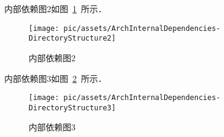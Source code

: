 内部依赖图2如图~\ref{ArchInternalDependencies-DirectoryStructure2}~所示．	

     \begin{figure}[!htbp]
            \centering	\texttt{[image: pic/assets/ArchInternalDependencies-DirectoryStructure2]}
            \caption{内部依赖图2}	\label{ArchInternalDependencies-DirectoryStructure2}	\end{figure} 

内部依赖图3如图~\ref{ArchInternalDependencies-DirectoryStructure3}~所示．	

     \begin{figure}[!htbp]
            \centering	\texttt{[image: pic/assets/ArchInternalDependencies-DirectoryStructure3]}
            \caption{内部依赖图3}	\label{ArchInternalDependencies-DirectoryStructure3}	\end{figure} 


